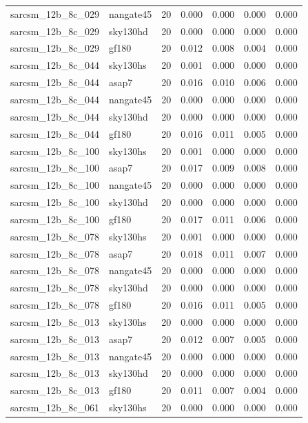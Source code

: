 \begin{tabular}{llrrrrr}
sarcsm\_12b\_8c\_029 & nangate45 & 20 & 0.000 & 0.000 & 0.000 & 0.000 \\
sarcsm\_12b\_8c\_029 & sky130hd & 20 & 0.000 & 0.000 & 0.000 & 0.000 \\
sarcsm\_12b\_8c\_029 & gf180 & 20 & 0.012 & 0.008 & 0.004 & 0.000 \\
sarcsm\_12b\_8c\_044 & sky130hs & 20 & 0.001 & 0.000 & 0.000 & 0.000 \\
sarcsm\_12b\_8c\_044 & asap7 & 20 & 0.016 & 0.010 & 0.006 & 0.000 \\
sarcsm\_12b\_8c\_044 & nangate45 & 20 & 0.000 & 0.000 & 0.000 & 0.000 \\
sarcsm\_12b\_8c\_044 & sky130hd & 20 & 0.000 & 0.000 & 0.000 & 0.000 \\
sarcsm\_12b\_8c\_044 & gf180 & 20 & 0.016 & 0.011 & 0.005 & 0.000 \\
sarcsm\_12b\_8c\_100 & sky130hs & 20 & 0.001 & 0.000 & 0.000 & 0.000 \\
sarcsm\_12b\_8c\_100 & asap7 & 20 & 0.017 & 0.009 & 0.008 & 0.000 \\
sarcsm\_12b\_8c\_100 & nangate45 & 20 & 0.000 & 0.000 & 0.000 & 0.000 \\
sarcsm\_12b\_8c\_100 & sky130hd & 20 & 0.000 & 0.000 & 0.000 & 0.000 \\
sarcsm\_12b\_8c\_100 & gf180 & 20 & 0.017 & 0.011 & 0.006 & 0.000 \\
sarcsm\_12b\_8c\_078 & sky130hs & 20 & 0.001 & 0.000 & 0.000 & 0.000 \\
sarcsm\_12b\_8c\_078 & asap7 & 20 & 0.018 & 0.011 & 0.007 & 0.000 \\
sarcsm\_12b\_8c\_078 & nangate45 & 20 & 0.000 & 0.000 & 0.000 & 0.000 \\
sarcsm\_12b\_8c\_078 & sky130hd & 20 & 0.000 & 0.000 & 0.000 & 0.000 \\
sarcsm\_12b\_8c\_078 & gf180 & 20 & 0.016 & 0.011 & 0.005 & 0.000 \\
sarcsm\_12b\_8c\_013 & sky130hs & 20 & 0.000 & 0.000 & 0.000 & 0.000 \\
sarcsm\_12b\_8c\_013 & asap7 & 20 & 0.012 & 0.007 & 0.005 & 0.000 \\
sarcsm\_12b\_8c\_013 & nangate45 & 20 & 0.000 & 0.000 & 0.000 & 0.000 \\
sarcsm\_12b\_8c\_013 & sky130hd & 20 & 0.000 & 0.000 & 0.000 & 0.000 \\
sarcsm\_12b\_8c\_013 & gf180 & 20 & 0.011 & 0.007 & 0.004 & 0.000 \\
sarcsm\_12b\_8c\_061 & sky130hs & 20 & 0.000 & 0.000 & 0.000 & 0.000 \\

\end{tabular}
